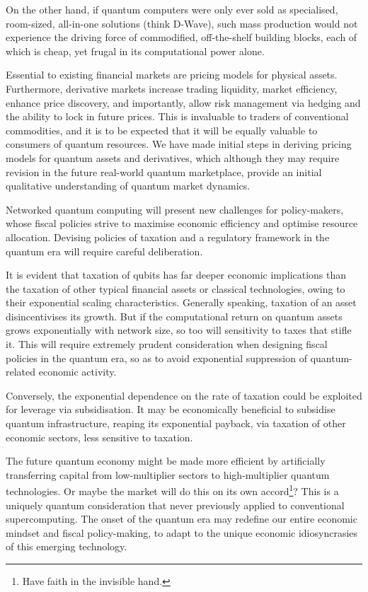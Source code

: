 On the other hand, if quantum computers were only ever sold as specialised, room-sized, all-in-one solutions (think D-Wave\texttrademark), such mass production would not experience the driving force of commodified, off-the-shelf building blocks, each of which is cheap, yet frugal in its computational power alone.

Essential to existing financial markets are pricing models for physical assets. Furthermore, derivative markets increase trading liquidity, market efficiency, enhance price discovery, and importantly, allow risk management via hedging and the ability to lock in future prices. This is invaluable to traders of conventional commodities, and it is to be expected that it will be equally valuable to consumers of quantum resources. We have made initial steps in deriving pricing models for quantum assets and derivatives, which although they may require revision in the future real-world quantum marketplace, provide an initial qualitative understanding of quantum market dynamics.

Networked quantum computing will present new challenges for policy-makers, whose fiscal policies strive to maximise economic efficiency and optimise resource allocation. Devising policies of taxation and a regulatory framework in the quantum era will require careful deliberation.

It is evident that taxation of qubits has far deeper economic implications than the taxation of other typical financial assets or classical technologies, owing to their exponential scaling characteristics. Generally speaking, taxation of an asset disincentivises its growth. But if the computational return on quantum assets grows exponentially with network size, so too will sensitivity to taxes that stifle it. This will require extremely prudent consideration when designing fiscal policies in the quantum era, so as to avoid exponential suppression of quantum-related economic activity.

Conversely, the exponential dependence on the rate of taxation could be exploited for leverage via subsidisation. It may be economically beneficial to subsidise quantum infrastructure, reaping its exponential payback, via taxation of other economic sectors, less sensitive to taxation.

The future quantum economy might be made more efficient by artificially transferring capital from low-multiplier sectors to high-multiplier quantum technologies. Or maybe the market will do this on its own accord\footnote{Have faith in the invisible hand.}? This is a uniquely quantum consideration that never previously applied to conventional supercomputing. The onset of the quantum era may redefine our entire economic mindset and fiscal policy-making, to adapt to the unique economic idiosyncrasies of this emerging technology.